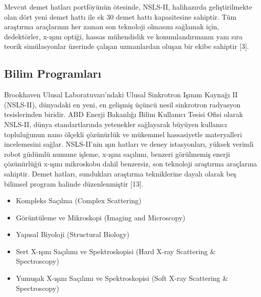 \documentclass{article}
\begin{document}
Mevcut demet hatları portföyünün ötesinde, NSLS-II, halihazırda geliştirilmekte olan dört yeni demet hattı ile ek 30 demet hattı kapasitesine sahiptir. Tüm araştırma araçlarının her zaman son teknoloji olmasını sağlamak için, dedektörler, x-ışını optiği, hassas mühendislik ve konumlandırmanın yanı sıra teorik simülasyonlar üzerinde çalışan uzmanlardan oluşan bir ekibe sahiptir [3].

\subsection{Bilim Programları}

Brookhaven Ulusal Laboratuvarı'ndaki Ulusal Sinkrotron Işınım Kaynağı II (NSLS-II), dünyadaki en yeni, en gelişmiş üçüncü nesil sinkrotron radyasyon tesislerinden biridir. ABD Enerji Bakanlığı Bilim Kullanıcı Tesisi Ofisi olarak NSLS-II, dünya standartlarında yetenekler sağlayarak büyüyen kullanıcı topluluğunun nano ölçekli çözünürlük ve mükemmel hassasiyetle materyalleri incelemesini sağlar. NSLS-II'nin ışın hatları ve deney istasyonları, yüksek verimli robot güdümlü numune işleme, x-ışını saçılımı, benzeri görülmemiş enerji çözünürlüğü x-ışını mikroskobu dahil benzersiz, son teknoloji araştırma araçlarına sahiptir. Demet hatları, sundukları araştırma tekniklerine dayalı olarak beş bilimsel program halinde düzenlenmiştir [13].

\begin{itemize}
    \item Kompleks Saçılma (Complex Scattering)
    
    \item Görüntüleme ve Mikroskopi (Imaging and Microscopy)
    
    \item Yapısal Biyoloji (Structural Biology)
    
    \item Sert X-ışını Saçılımı ve Spektroskopisi (Hard X-ray Scattering \& Spectroscopy) 
    
    \item Yumuşak X-ışını Saçılımı ve Spektroskopisi (Soft X-ray Scattering \& Spectroscopy) 
\end{itemize}
\end{document}
